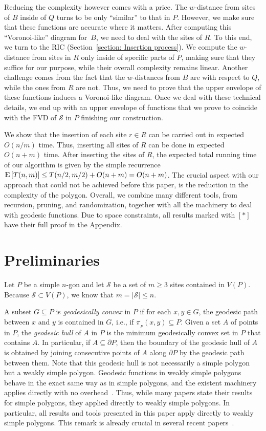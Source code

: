 \documentclass[a4paper,UKenglish]{socg-lipics-v2018}
\newcommand{\s}{\mathcal S}
\newcommand{\p}[3][P]{\ensuremath{\pi_{_{#1}}(#2, #3)}}
\newcommand{\ex}[1]{\textsc{E}\left[#1\right]}
\begin{document}
Reducing the complexity however comes with a price. The $w$-distance from sites  of $B$ inside of $Q$ turns to be only ``similar'' to that in $P$.
However, we make sure that these functions are accurate where it matters. 
After computing this ``Voronoi-like'' diagram for~$B$, we need to deal with the sites of $R$. 
To this end, we turn to the RIC (Section~\ref{section: Insertion process}).
We compute the $w$-distance from sites in $R$ only inside of specific parts of $P$, making sure that they suffice for our purpose, while their overall complexity remains linear.
Another challenge comes from the fact that the $w$-distances from $B$ are with respect to $Q$, while the ones from $R$ are not.
Thus, we need to prove that the upper envelope of these functions induces a Voronoi-like diagram.
Once we deal with these technical details, we end up with an upper envelope of functions that we prove to coincide with the FVD of $\s$ in $P$ finishing our construction. 

We show that the insertion of each site $r\in R$ can be carried out in expected $O(n/m)$ time.  
Thus, inserting all sites of $R$ can be done in expected $O(n+ m)$ time.
After inserting the sites of $R$, the expected total running time of our algorithm is given by the simple recurrence $\ex{T(n, m)} \leq T(n/2, m/2) + O(n+m) = O(n+ m)$.
The crucial aspect with our approach that could not be achieved before this paper, is the reduction in the complexity of the polygon. 
Overall, we combine many different tools, from recursion, pruning, and randomization, together with all the machinery to deal with geodesic functions. 
Due to space constraints, all results marked with $[*]$ have their full proof in the Appendix. 

\section{Preliminaries}

Let $P$ be a simple $n$-gon and  let $\s$ be a set of $m\geq 3$ sites contained in $V(P)$. 
Because $\s\subset V(P)$, we know that $m = |\s|\leq  n$.

A subset $G\subseteq P$ is \emph{geodesically convex} in $P$ if for each $x,y\in G$, the geodesic path between $x$ and $y$ is contained in $G$, i.e., if $\p{x}{y}\subseteq P$.
Given a set $A$ of points in $P$, the \emph{geodesic hull} of $A$ in $P$ is the minimum geodesically convex set in $P$ that contains $A$. 
In particular, if $A\subseteq \partial P$, then the boundary of the geodesic hull of $A$ is obtained by joining consecutive points of $A$ along $\partial P$ by the geodesic path between them. Note that this geodesic hull is not necessarily a simple polygon but a weakly simple polygon. 
Geodesic functions in weakly simple polygons behave in the exact same way as in simple polygons, and the existent machinery applies directly with no overhead~\cite{chang2014detecting}. 
Thus, while many papers state their results for simple polygons, they applied directly to weakly simple polygons. 
In particular, all results and tools presented in this paper apply directly to weakly simple polygons.
This remark is already crucial in several recent papers~\cite{oh2016computing,oh2016farthest}.
\end{document}
